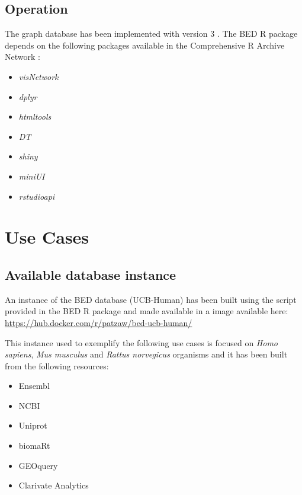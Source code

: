 \documentclass[9pt,a4paper,]{extarticle}
\theoremstyle{definition}
\theoremstyle{definition}
\theoremstyle{definition}
\theoremstyle{remark}
\begin{document}
\subsection{Operation}\label{operation}

The graph database has been implemented
with \neo{} version 3 \citep{neo4j_inc_neo4j_2017}.
The BED R package depends on the following packages available in the
Comprehensive R Archive Network \citep{cran_comprehensive_nodate}:

\begin{itemize}
\item
  \emph{visNetwork} \citep{almende_b.v._visnetwork:_2017}
\item
  \emph{dplyr} \citep{wickham_dplyr:_2017}
\item
  \emph{htmltools} \citep{rstudio_inc_htmltools:_2017}
\item
  \emph{DT} \citep{xie_dt:_2016}
\item
  \emph{shiny} \citep{chang_shiny:_2017}
\item
  \emph{miniUI} \citep{cheng_miniui:_2016}
\item
  \emph{rstudioapi} \citep{allaire_rstudioapi:_2017}
\end{itemize}

\section{Use Cases}\label{use-cases}

\subsection{Available database instance}\label{available-database-instance}

An instance of the BED database (UCB-Human)
has been built using the script provided
in the BED R package and made available in a \docker{}
image \citep{docker_inc_docker_2017} available here:
\url{https://hub.docker.com/r/patzaw/bed-ucb-human/}

This instance used to exemplify the following use cases
is focused on \emph{Homo sapiens}, \emph{Mus musculus} and \emph{Rattus norvegicus} organisms
and it has been built from the following resources:

\begin{itemize}
\item
  Ensembl \citep{zerbino_ensembl_2017}
\item
  NCBI \citep{ncbi_resource_coordinators_database_2017}
\item
  Uniprot \citep{the_uniprot_consortium_uniprot:_2017}
\item
  biomaRt \citep{durinck_mapping_2009}
\item
  GEOquery \citep{davis_geoquery:_2007}
\item
  Clarivate Analytics \metabase{} \citep{clarivate_analytics_metacore_2017}
\end{itemize}
\end{document}
